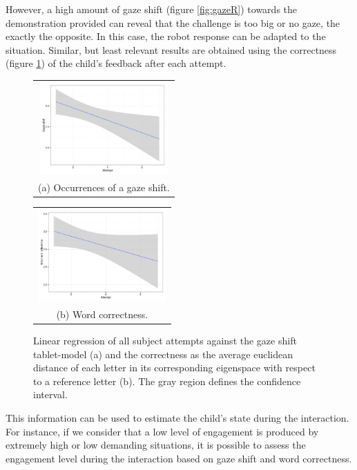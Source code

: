 \documentclass{sig-alternate}
\begin{document}
However, a high amount of gaze shift (figure \ref{fig:gazeR}) towards the
demonstration provided can reveal that the challenge is too big or no gaze, the
exactly the opposite. In this case, the robot response can be adapted to the
situation. Similar, but least relevant results are obtained using the
correctness (figure \ref{fig:errorR}) of the child's feedback after each
attempt. 

\begin{figure}
  \centering
  \begin{tabular}{@{}c@{}}
    \includegraphics[width=.7\linewidth,height=100pt]{gazeR} \\
    \small (a) Occurrences of a gaze shift.
  \end{tabular}\label{fig:gazeR}

  \vspace{\floatsep}

  \begin{tabular}{@{}c@{}}
    \includegraphics[width=.7\linewidth,height=100pt]{errorR} \\
    \small (b) Word correctness.
  \end{tabular}\label{fig:errorR}

  \caption{ \small Linear regression of all subject attempts against the gaze
  shift tablet-model (a) and the correctness as the average euclidean distance
  of each letter in its corresponding eigenspace with respect to a reference
  letter (b). The gray region defines the confidence interval.}
  
\end{figure}


This information can be used to estimate the child's state during the
interaction. For instance, if we consider that a low level of engagement is
produced by extremely high or low demanding situations, it is possible to assess
the engagement level during the interaction based on gaze shift and word
correctness.
\end{document}
